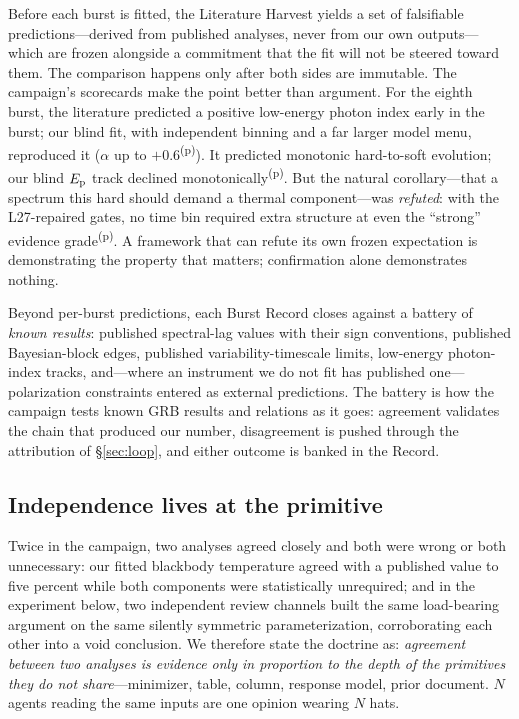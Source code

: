 \documentclass[twocolumn]{aastex631}
\newcommand{\prov}{\textsuperscript{(p)}}   %
\newcommand{\Ep}{E_{\rm p}}
\begin{document}
Before each burst is fitted, the Literature Harvest yields a set of
falsifiable predictions---derived from published analyses, never from our own
outputs---which are frozen alongside a commitment that the fit will not be
steered toward them. The comparison happens only after both sides are
immutable. The campaign's scorecards make the point better than argument.
For the eighth burst, the literature predicted a positive low-energy photon
index early in the burst; our blind fit, with independent binning and a far
larger model menu, reproduced it ($\alpha$ up to $+0.6$\prov). It predicted
monotonic hard-to-soft evolution; our blind $\Ep$ track declined
monotonically\prov. But the natural corollary---that a spectrum this hard
should demand a thermal component---was \emph{refuted}: with the L27-repaired
gates, no time bin required extra structure at even the ``strong'' evidence
grade\prov. A framework that can refute its own frozen expectation is
demonstrating the property that matters; confirmation alone demonstrates
nothing.

Beyond per-burst predictions, each Burst Record closes against a battery
of \emph{known results}: published spectral-lag values with their sign
conventions, published Bayesian-block edges, published
variability-timescale limits, low-energy photon-index tracks, and---where
an instrument we do not fit has published one---polarization constraints
entered as external predictions. The battery is how the campaign tests
known GRB results and relations as it goes: agreement validates the chain
that produced our number, disagreement is pushed through the attribution
of \S\ref{sec:loop}, and either outcome is banked in the Record.

\subsection{Independence lives at the primitive}

Twice in the campaign, two analyses agreed closely and both were wrong or
both unnecessary: our fitted blackbody temperature agreed with a published
value to five percent while both components were statistically unrequired;
and in the experiment below, two independent review channels built the same
load-bearing argument on the same silently symmetric parameterization,
corroborating each other into a void conclusion. We therefore state the
doctrine as: \emph{agreement between two analyses is evidence only in
proportion to the depth of the primitives they do not share}---minimizer,
table, column, response model, prior document. $N$ agents reading the same
inputs are one opinion wearing $N$ hats.
\end{document}
